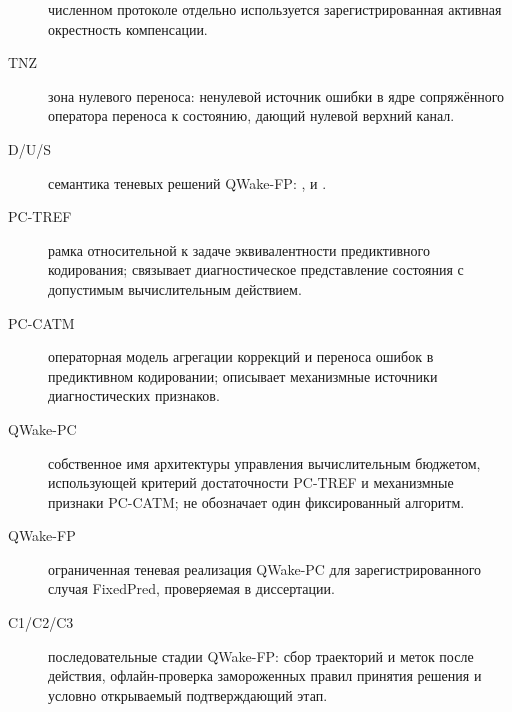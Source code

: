 \begin{description}
    численном протоколе отдельно используется зарегистрированная активная
    окрестность компенсации.
  \item[TNZ] зона нулевого переноса: ненулевой источник ошибки в ядре
    сопряжённого оператора переноса к состоянию, дающий нулевой верхний канал.
  \item[D/U/S] семантика теневых решений QWake-FP: ,
     и .
  \item[PC-TREF] рамка относительной к задаче эквивалентности
    предиктивного кодирования; связывает диагностическое представление
    состояния с допустимым вычислительным действием.
  \item[PC-CATM] операторная модель агрегации коррекций и переноса ошибок в
    предиктивном кодировании; описывает механизмные источники диагностических
    признаков.
  \item[QWake-PC] собственное имя архитектуры управления вычислительным
    бюджетом, использующей критерий достаточности PC-TREF и механизмные признаки
    PC-CATM; не обозначает один фиксированный алгоритм.
  \item[QWake-FP] ограниченная теневая реализация QWake-PC для
    зарегистрированного случая FixedPred, проверяемая в диссертации.
  \item[C1/C2/C3] последовательные стадии QWake-FP: сбор траекторий и меток
    после действия, офлайн-проверка замороженных правил принятия решения и
    условно открываемый подтверждающий этап.
\end{description}

